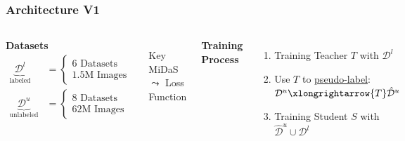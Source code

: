 \documentclass[12pt]{beamer}
\begin{document}
\begin{frame}
    \frametitle{Architecture V1}
    
    \begin{columns}
        
        
        \textbf{Datasets}
        \begin{equation*}
            \begin{aligned}
                \underbrace{\mathcal{D}^l}_{\text{labeled}} &= 
                \begin{cases} 
                    \text{6 Datasets} \\ 
                    \text{1.5M Images} 
                \end{cases} \\
                \underbrace{\mathcal{D}^u}_{\text{unlabeled}} &= 
                \begin{cases} 
                    \text{8 Datasets} \\ 
                    \text{62M Images} 
                \end{cases}
            \end{aligned}
        \end{equation*}
        \pause
        \begin{itemize}
            \item[Key] MiDaS $\leadsto$ Loss Function
        \end{itemize}
        
        
        \pause
        \textbf{Training Process}
        \begin{enumerate}
            \item<4-> Training Teacher $T$ with $\mathcal{D}^l$
            
            \item<5-> Use $T$ to \underline{pseudo-label}:
            \\$\mathcal{D}^u \xlongrightarrow{T} \hat{\mathcal{D}}^u $
            
            \item<6-> Training Student $S$ with $\hat{\mathcal{D}}^u \cup \mathcal{D}^l$
        \end{enumerate}
    
    \end{columns}
\end{frame}
\end{document}
